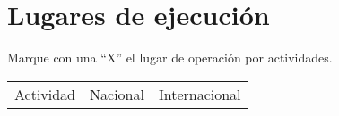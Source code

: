 
\section{Lugares de ejecución}
\begin{instrucciones}
Marque con una “X” el lugar de operación por actividades.  
\end{instrucciones}

\begin{tabular}{|l|l|l|}\hline
  Actividad & Nacional & Internacional \\
\end{tabular}


